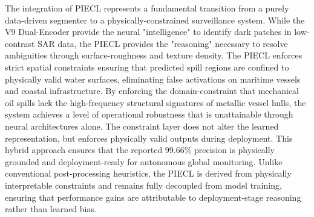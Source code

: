The integration of PIECL represents a fundamental transition from a purely data-driven segmenter to a physically-constrained surveillance system. While the V9 Dual-Encoder provide the neural "intelligence" to identify dark patches in low-contrast SAR data, the PIECL provides the "reasoning" necessary to resolve ambiguities through surface-roughness and texture density. The PIECL enforces strict spatial constraints ensuring that predicted spill regions are confined to physically valid water surfaces, eliminating false activations on maritime vessels and coastal infrastructure. By enforcing the domain-constraint that mechanical oil spills lack the high-frequency structural signatures of metallic vessel hulls, the system achieves a level of operational robustness that is unattainable through neural architectures alone. The constraint layer does not alter the learned representation, but enforces physically valid outputs during deployment. This hybrid approach ensures that the reported 99.66\% precision is physically grounded and deployment-ready for autonomous global monitoring. Unlike conventional post-processing heuristics, the PIECL is derived from physically interpretable constraints and remains fully decoupled from model training, ensuring that performance gains are attributable to deployment-stage reasoning rather than learned bias.
